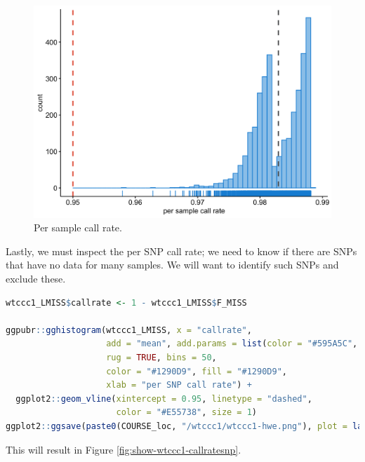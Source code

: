 \documentclass[
]{book}
\begin{document}
\begin{figure}

{\centering \includegraphics[width=18.67in]{img/_gwas_wtccc/WTCCC1-callrate-samples} 

}

\caption{Per sample call rate.}\label{fig:show-wtccc1-callratesample}
\end{figure}

Lastly, we must inspect the per SNP call rate; we need to know if there are SNPs that have no data for many samples. We will want to identify such SNPs and exclude these.

\begin{lstlisting}[language=R]
wtccc1_LMISS$callrate <- 1 - wtccc1_LMISS$F_MISS

ggpubr::gghistogram(wtccc1_LMISS, x = "callrate",
                    add = "mean", add.params = list(color = "#595A5C", linetype = "dashed", size = 1),
                    rug = TRUE, bins = 50,
                    color = "#1290D9", fill = "#1290D9",
                    xlab = "per SNP call rate") +
  ggplot2::geom_vline(xintercept = 0.95, linetype = "dashed",
                      color = "#E55738", size = 1)
ggplot2::ggsave(paste0(COURSE_loc, "/wtccc1/wtccc1-hwe.png"), plot = last_plot())
\end{lstlisting}

This will result in Figure \ref{fig:show-wtccc1-callratesnp}.
\end{document}

